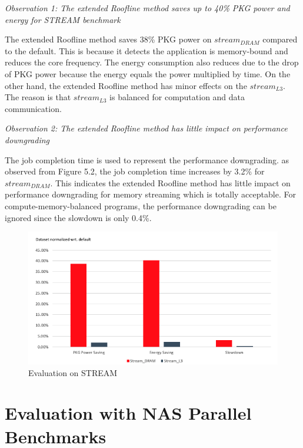 \textit{Observation 1: The extended Roofline method saves up to 40\% PKG power and energy for STREAM benchmark}

The extended Roofline method saves 38\% PKG power on $stream_{DRAM}$ compared to the default. This is because it detects the application is memory-bound and reduces the core frequency. The energy consumption also reduces due to the drop of PKG power because the energy equals the power multiplied by time. On the other hand, the extended Roofline method has minor effects on the $stream_{L3}$. The reason is that $stream_{L3}$ is balanced for computation and data communication.

\textit{Observation 2: The extended Roofline method has little impact on performance downgrading}

The job completion time is used to represent the performance downgrading. as observed from Figure 5.2, the job completion time increases by 3.2\% for $stream_{DRAM}$. This indicates the extended Roofline method has little impact on performance downgrading for memory streaming which is totally acceptable. For compute-memory-balanced programs, the performance downgrading can be ignored since the slowdown is only 0.4\%.


	
\begin{figure} [h] %
	\centering   %
	\includegraphics[width=17cm]{pictures/Stream}
	\caption{Evaluation on STREAM}
\end{figure}

\section{Evaluation with NAS Parallel Benchmarks}

